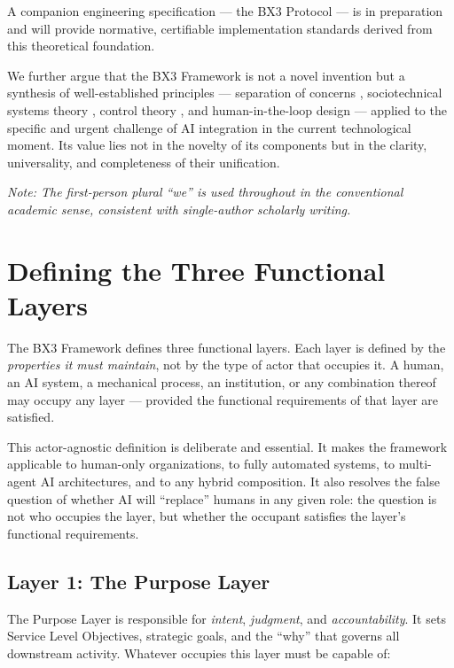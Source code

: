 \documentclass[12pt]{article}
\begin{document}
A companion engineering specification --- the BX3 Protocol --- is in preparation and will provide normative, certifiable implementation standards derived from this theoretical foundation.

We further argue that the BX3 Framework is not a novel invention but a synthesis of well-established principles --- separation of concerns \cite{dijkstra1982}, sociotechnical systems theory \cite{trist1981}, control theory \cite{wiener1948}, and human-in-the-loop design \cite{bansal2019} --- applied to the specific and urgent challenge of AI integration in the current technological moment. Its value lies not in the novelty of its components but in the clarity, universality, and completeness of their unification.

\textit{Note: The first-person plural ``we'' is used throughout in the conventional academic sense, consistent with single-author scholarly writing.}

\section{Defining the Three Functional Layers}
\label{sec:layers}

The BX3 Framework defines three functional layers. Each layer is defined by the \textit{properties it must maintain}, not by the type of actor that occupies it. A human, an AI system, a mechanical process, an institution, or any combination thereof may occupy any layer --- provided the functional requirements of that layer are satisfied.

This actor-agnostic definition is deliberate and essential. It makes the framework applicable to human-only organizations, to fully automated systems, to multi-agent AI architectures, and to any hybrid composition. It also resolves the false question of whether AI will ``replace'' humans in any given role: the question is not who occupies the layer, but whether the occupant satisfies the layer's functional requirements.

\subsection{Layer 1: The Purpose Layer}

The Purpose Layer is responsible for \textit{intent}, \textit{judgment}, and \textit{accountability}. It sets Service Level Objectives, strategic goals, and the ``why'' that governs all downstream activity. Whatever occupies this layer must be capable of:
\end{document}
